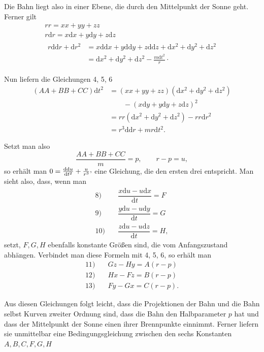 \par Die Bahn liegt also in einer Ebene, die durch den Mittelpunkt der Sonne geht. Ferner gilt
\[
\begin{gathered}
rr=xx+yy+zz\\
r\mathrm{d}r=x\mathrm{d}x+y\mathrm{d}y+z\mathrm{d}z\\
\begin{aligned}
r\mathrm{dd}r+\mathrm{d}r^2&=x\mathrm{dd}x+y\mathrm{dd}y+z\mathrm{dd}z+\mathrm{d}x^2+\mathrm{d}y^2+\mathrm{d}z^2\\
&=\mathrm{d}x^2+\mathrm{d}y^2+\mathrm{d}z^2-\frac{m\mathrm{d}t^2}{r}\mathpunct{\cdot}
\end{aligned}
\end{gathered}
\]
\par Nun liefern die Gleichungen 4, 5, 6
\[
\begin{aligned}
(AA+BB+CC)\mathrm{d}t^2
&=(xx+yy+zz)(\mathrm{d}x^2+\mathrm{d}y^2+\mathrm{d}z^2)\\
&\qquad{}-(x\mathrm{d}y+y\mathrm{d}y+z\mathrm{d}z)^2\\
&=rr(\mathrm{d}x^2+\mathrm{d}y^2+\mathrm{d}z^2)-rr\mathrm{d}r^2\\
&=r^3\mathrm{dd}r+mr\mathrm{d}t^2.
\end{aligned}
\]
\par Setzt man also
\[
\frac{AA+BB+CC}{m}=p,\qquad r-p=u,
\]
so erhält man \(0=\frac{\mathrm{dd}u}{\mathrm{d}t^2}+\frac{u}{r^3}\mathpunct{\raisebox{.45ex}{,}}\) eine Gleichung, die den ersten drei entspricht. Man sieht also, dass, wenn man
\[
\begin{array}{rl}
8)\quad&\dfrac{x\mathrm{d}u-u\mathrm{d}x}{\mathrm{d}t}=F\\[5pt]
9)\quad&\dfrac{y\mathrm{d}u-u\mathrm{d}y}{\mathrm{d}t}=G\\[5pt]
10)\quad&\dfrac{z\mathrm{d}u-u\mathrm{d}z}{\mathrm{d}t}=H,
\end{array}
\]
setzt, \(F,G,H\) ebenfalls konstante Größen sind, die vom Anfangszustand abhängen. Verbindet man diese Formeln mit 4, 5, 6, so erhält man
\[
\begin{array}{rl}
11)\quad&Gz-Hy=A(r-p)\\
12)\quad&Hx-Fz=B(r-p)\\
13)\quad&Fy-Gx=C(r-p).
\end{array}
\]
\par Aus diesen Gleichungen folgt leicht, dass die Projektionen der Bahn und die Bahn selbst Kurven zweiter Ordnung sind, dass die Bahn den Halbparameter \(p\) hat und dass der Mittelpunkt der Sonne einen ihrer Brennpunkte einnimmt. Ferner liefern sie unmittelbar eine Bedingungsgleichung zwischen den sechs Konstanten \(A,B,C,F,G,H\)
